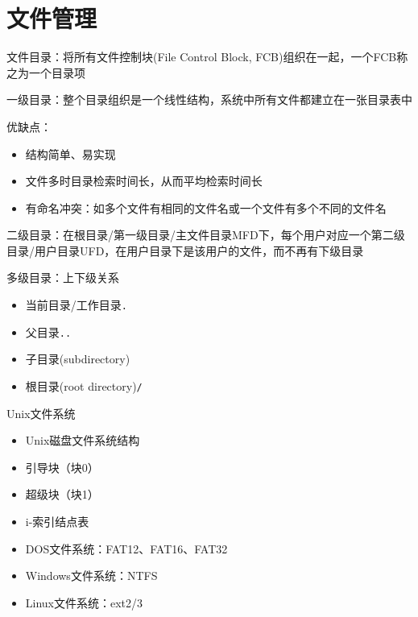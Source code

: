 
\section{文件管理}
文件目录：将所有文件控制块(File Control Block, FCB)组织在一起，一个FCB称之为一个目录项

一级目录：整个目录组织是一个线性结构，系统中所有文件都建立在一张目录表中

优缺点：
\begin{itemize}
    \item 结构简单、易实现
    \item 文件多时目录检索时间长，从而平均检索时间长
    \item 有命名冲突：如多个文件有相同的文件名或一个文件有多个不同的文件名
\end{itemize}

二级目录：在根目录/第一级目录/主文件目录MFD下，每个用户对应一个第二级目录/用户目录UFD，在用户目录下是该用户的文件，而不再有下级目录

多级目录：上下级关系
\begin{itemize}
    \item 当前目录/工作目录\verb'.'
    \item 父目录\verb'..'
    \item 子目录(subdirectory)
    \item 根目录(root directory)\verb'/'
\end{itemize}

Unix文件系统
\begin{itemize}
    \item Unix磁盘文件系统结构
    \item 引导块（块0）
    \item 超级块（块1）
    \item i-索引结点表
\end{itemize}

\begin{itemize}
\item DOS文件系统：FAT12、FAT16、FAT32
\item Windows文件系统：NTFS
\item Linux文件系统：ext2/3
\end{itemize}